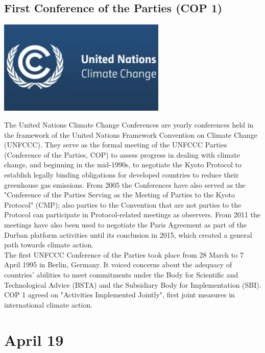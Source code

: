 \documentclass[11pt]{report}
\begin{document}
\subsection{First Conference of the Parties (COP 1)}
\vspace{2mm}\begin{center}\includegraphics[width=8cm]{./img/coplogo.jpg}\end{center}
The United Nations Climate Change Conferences are yearly conferences held in the framework of the United Nations Framework Convention on Climate Change (UNFCCC). They serve as the formal meeting of the UNFCCC Parties (Conference of the Parties, COP) to assess progress in dealing with climate change, and beginning in the mid-1990s, to negotiate the Kyoto Protocol to establish legally binding obligations for developed countries to reduce their greenhouse gas emissions. From 2005 the Conferences have also served as the "Conference of the Parties Serving as the Meeting of Parties to the Kyoto Protocol" (CMP); also parties to the Convention that are not parties to the Protocol can participate in Protocol-related meetings as observers. From 2011 the meetings have also been used to negotiate the Paris Agreement as part of the Durban platform activities until its conclusion in 2015, which created a general path towards climate action.\\
\indent The first UNFCCC Conference of the Parties took place from 28 March to 7 April 1995 in Berlin, Germany. It voiced concerns about the adequacy of countries' abilities to meet commitments under the Body for Scientific and Technological Advice (BSTA) and the Subsidiary Body for Implementation (SBI). COP 1 agreed on "Activities Implemented Jointly", first joint measures in international climate action.
\section{April 19}
\end{document}
